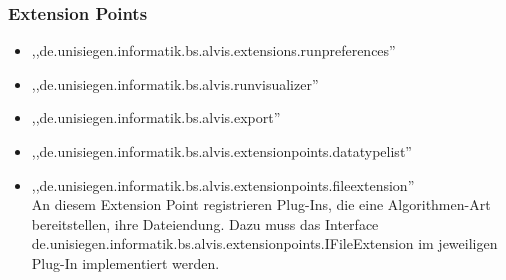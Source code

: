 \documentclass[10pt,a4paper,oneside]{scrbook}
\begin{document}
\subsubsection{Extension Points}
\begin{itemize}
 \item ,,de.unisiegen.informatik.bs.alvis.extensions.runpreferences''\\
 \item ,,de.unisiegen.informatik.bs.alvis.runvisualizer''\\
 \item ,,de.unisiegen.informatik.bs.alvis.export''\\
 \item ,,de.unisiegen.informatik.bs.alvis.extensionpoints.datatypelist''\\
 \item ,,de.unisiegen.informatik.bs.alvis.extensionpoints.fileextension''\\
	  An diesem Extension Point registrieren Plug-Ins, die eine Algorithmen-Art
	  bereitstellen, ihre Dateiendung. Dazu muss das Interface
	  de.\-unisiegen.\-informatik.\-bs.\-alvis.\-extension\-points.\-IFileExtension im jeweiligen
	  Plug-In implementiert werden.
\end{itemize}
\end{document}
